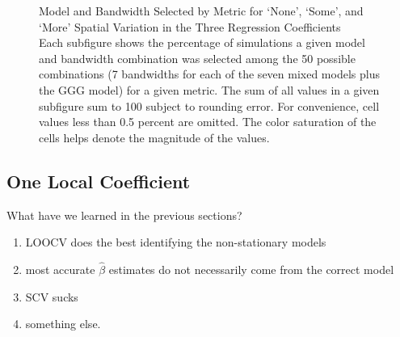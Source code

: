 \documentclass{article}\usepackage[]{graphicx}\usepackage[]{color}
\begin{document}
\begin{figure}
\caption{Model and Bandwidth Selected by Metric for `None', `Some', and `More' Spatial Variation in the Three Regression Coefficients \\ Each subfigure shows the percentage of simulations a given model and bandwidth combination was selected among the 50 possible combinations (7 bandwidths for each of the seven mixed models plus the GGG model) for a given metric. The sum of all values in a given subfigure sum to 100 subject to rounding error. For convenience, cell values less than 0.5 percent are omitted. The color saturation of the cells helps denote the magnitude of the values.}
\label{fig:GGG2LLLmodelBandwidths}
\end{figure}

\subsection{One Local Coefficient}

What have we learned in the previous sections?
\begin{enumerate}
\item LOOCV does the best identifying the non-stationary models
\item most accurate $\hat{\beta}$ estimates do not necessarily come from the correct model
\item SCV sucks
\item something else.
\end{enumerate}
\end{document}
